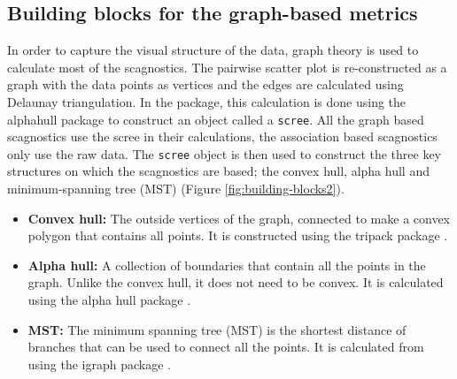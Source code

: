 \hypertarget{building-blocks-for-the-graph-based-metrics}{%
\subsection{Building blocks for the graph-based
metrics}\label{building-blocks-for-the-graph-based-metrics}}

In order to capture the visual structure of the data, graph theory is
used to calculate most of the scagnostics. The pairwise scatter plot is
re-constructed as a graph with the data points as vertices and the edges
are calculated using Delaunay triangulation. In the package, this
calculation is done using the alphahull package \citep{alphahull} to
construct an object called a \texttt{scree}. All the graph based
scagnostics use the scree in their calculations, the association based
scagnostics only use the raw data. The \texttt{scree} object is then
used to construct the three key structures on which the scagnostics are
based; the convex hull, alpha hull and minimum-spanning tree (MST)
(Figure \ref{fig:building-blocks2}).

\begin{itemize}
\item
  \textbf{Convex hull:} The outside vertices of the graph, connected to
  make a convex polygon that contains all points. It is constructed
  using the tripack package \citep{tripack}.
\item
  \textbf{Alpha hull:} A collection of boundaries that contain all the
  points in the graph. Unlike the convex hull, it does not need to be
  convex. It is calculated using the alpha hull package
  \citep{alphahull}.
\item
  \textbf{MST:} The minimum spanning tree (MST) is the shortest distance
  of branches that can be used to connect all the points. It is
  calculated from using the igraph package \citep{igraph}.
\end{itemize}

